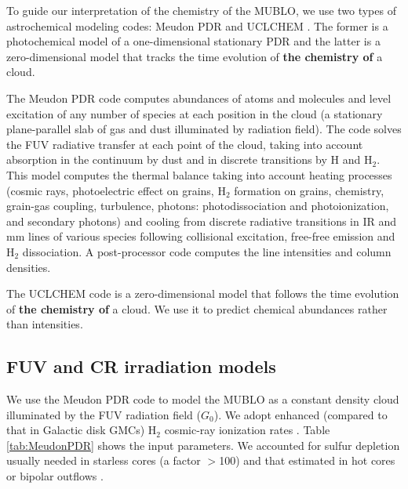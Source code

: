 \documentclass[]{aastex631}
\newcommand{\kms}{\ensuremath{\mathrm{km~s}^{-1}}\xspace}
\def\rr#1{\textbf{#1}}
\begin{document}
To guide our interpretation of the chemistry of the MUBLO, we use two types of astrochemical modeling codes: Meudon PDR \citep{LePetit2006} and UCLCHEM \citep{Holdship2017}. The former is a photochemical model of a one-dimensional stationary PDR and the latter is a zero-dimensional model that tracks the time evolution of \rr{the chemistry of} a cloud.

The Meudon PDR code computes abundances of atoms and molecules and level excitation of any number of species at each position in the cloud (a stationary plane-parallel slab of gas and dust illuminated by radiation field). 
The code solves the FUV radiative transfer at each point of the cloud, taking into account absorption in the continuum by dust and in discrete transitions by H and H$_2$.
This model computes the thermal balance taking into account heating processes (cosmic rays, photoelectric effect on grains, H$_2$ formation on grains, chemistry, grain-gas coupling, turbulence,  photons: photodissociation and photoionization, and secondary photons) and cooling from discrete radiative transitions in IR and mm lines of various species following collisional excitation, free-free emission and H$_2$ dissociation.
A post-processor code computes the line intensities and column densities. 

The UCLCHEM code is a zero-dimensional model that follows the time evolution of \rr{the chemistry of} a cloud.
We use it to predict chemical abundances rather than intensities.


\subsection{FUV and CR irradiation models}
\label{sec:meudon}
We use the Meudon PDR code to model the MUBLO as a constant density cloud illuminated by the FUV radiation field ($G_0$).
We adopt enhanced (compared to that in Galactic disk GMCs) H$_2$ cosmic-ray ionization rates \citep[e.g., $\zeta_\mathrm{CR}$$\approx$(3.5$\pm$1.4)$\times$10$^{-16}$s$^{-1}$ for the LSR velocity range 20-75\,\kms associated with the 50 km s$^{-1}$ cloud, see][]{Indriolo2015}.
Table \ref{tab:MeudonPDR} shows the input parameters. We accounted for sulfur depletion usually needed in starless cores (a factor $>$100) and that estimated in hot cores or bipolar outflows \citep[a factor $\sim$10; see][and references therein]{Fuente2023}.
\end{document}

